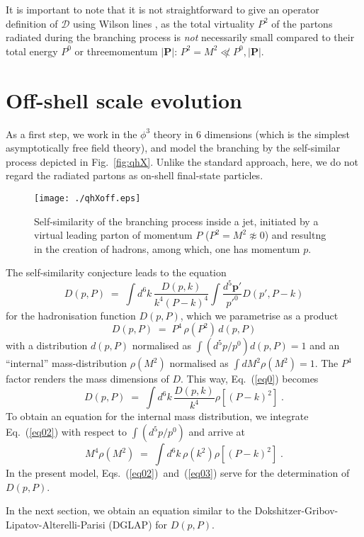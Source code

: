 \documentclass{PoS}
\newcommand{\be}{\begin{equation}}
\newcommand{\ee}[1]{\label{#1} \end{equation}}
\begin{document}
It is important to note that it is not straightforward to give an operator definition of $\mathcal D$ using Wilson lines \cite{bib:fact}, as the total virtuality $P^2$ of the partons radiated during the branching process is \textit{not} necessarily small compared to their total energy $P^0$ or threemomentum $|\mathbf P|$: $P^2=M^2\not\ll P^0, |\mathbf P|$.


\section{Off-shell scale evolution}
As a first step, we work in the $\phi^3$ theory in 6 dimensions (which is the simplest asymptotically free field theory), and model the branching by the self-similar process depicted in Fig.~\ref{fig:qhX}. Unlike the standard approach, here, we do not regard the radiated partons as on-shell final-state particles.  
\begin{figure}[h]
\begin{center}
\texttt{[image: ./qhXoff.eps]} %
\end{center}
\caption{Self-similarity of the branching process inside a jet, initiated by a virtual leading parton of momentum $P$ ($P^2 = M^2 \not\approx0$) and resultng in the creation of hadrons, among which, one has momentum $p$.
\label{fig:qhXoff}}
\end{figure}
The self-similarity conjecture leads to the equation
\be
D(p,P) \;=\; \int d^6k \, \frac{D(p,k)}{ k^4 (P-k)^4}    \int \frac{d^5\mathbf{p'}}{p'^0} D(p',P-k)  
\ee{eq0}
for the hadronisation function $D(p,P)$, which we parametrise as a product
\be
D(p,P) \;=\; P^4\, \rho\left(P^2\right)\, d(p,P) 
\ee{eq01}
with a distribution $d(p,P)$  normalised as $\int (d^5p / p^0) d(p,P) = 1$ and an ``internal'' mass-distribution $\rho(M^2)$ normalised as $\int dM^2 \rho(M^2) =1$. The $P^4$ factor renders the mass dimensions of $D$. This way, Eq.~(\ref{eq0}) becomes
\be
D(p,P) \;=\; \int d^6k \, \frac{D(p,k)}{ k^4}  \rho\left[(P-k)^2\right] \;. 
\ee{eq02}
To obtain an equation for the internal mass distribution, we integrate Eq.~(\ref{eq02})  with respect to $\int (d^5p / p^0)$ and arrive at 
\be
M^4 \rho\left(M^2\right) \;=\; \int d^6k \, \rho\left(k^2\right)  \rho\left[(P-k)^2\right] \;. 
\ee{eq03}
In the present model, Eqs.~(\ref{eq02})~and~(\ref{eq03}) serve for the determination of $D(p,P)$.

In the next section, we obtain an equation similar to the Dokshitzer-Gribov-Lipatov-Alterelli-Parisi (DGLAP) \cite{bib:DGLAP} for $D(p,P)$.
\end{document}
